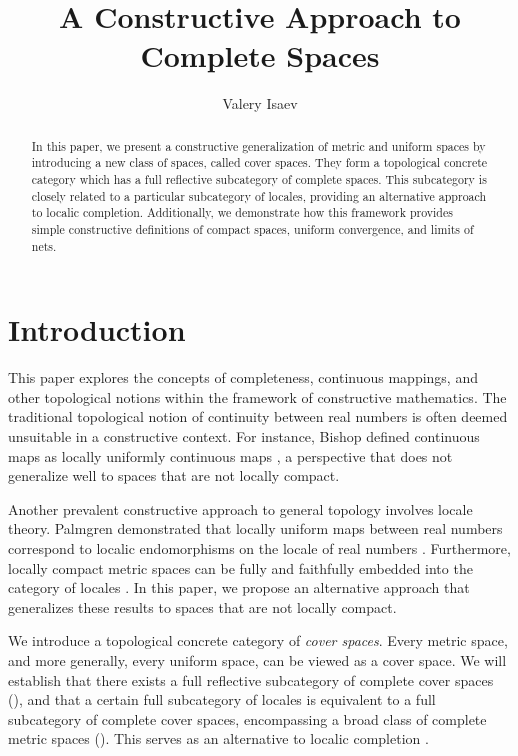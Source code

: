 \documentclass[reqno]{amsart}
\theoremstyle{definition}
\theoremstyle{remark}
\numberwithin{figure}{section}
\begin{document}
\title{A Constructive Approach to Complete Spaces}

\author{Valery Isaev}

\begin{abstract}
In this paper, we present a constructive generalization of metric and uniform spaces by introducing a new class of spaces, called cover spaces.
They form a topological concrete category which has a full reflective subcategory of complete spaces.
This subcategory is closely related to a particular subcategory of locales, providing an alternative approach to localic completion.
Additionally, we demonstrate how this framework provides simple constructive definitions of compact spaces, uniform convergence, and limits of nets.
\end{abstract}

\maketitle

\section{Introduction}

This paper explores the concepts of completeness, continuous mappings, and other topological notions within the framework of constructive mathematics.
The traditional topological notion of continuity between real numbers is often deemed unsuitable in a constructive context.
For instance, Bishop defined continuous maps as locally uniformly continuous maps \cite[Chapter 2, Definition 9]{bishop},
a perspective that does not generalize well to spaces that are not locally compact.

Another prevalent constructive approach to general topology involves locale theory.
Palmgren demonstrated that locally uniform maps between real numbers correspond to localic endomorphisms on the locale of real numbers \cite{palmgren-cont}.
Furthermore, locally compact metric spaces can be fully and faithfully embedded into the category of locales \cite{palmgren-metric-locales}.
In this paper, we propose an alternative approach that generalizes these results to spaces that are not locally compact.

We introduce a topological concrete category of \emph{cover spaces}.
Every metric space, and more generally, every uniform space, can be viewed as a cover space.
We will establish that there exists a full reflective subcategory of complete cover spaces (),
and that a certain full subcategory of locales is equivalent to a full subcategory of complete cover spaces,
encompassing a broad class of complete metric spaces ().
This serves as an alternative to localic completion \cite{localic-completion}.
\end{document}
